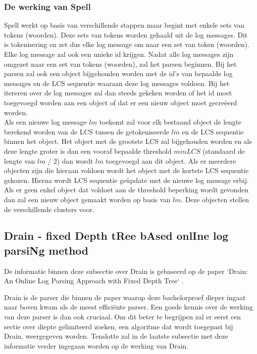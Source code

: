 \subsubsection{De werking van Spell}
Spell werkt op basis van verschillende stappen maar begint met enkele sets van tokens (woorden). Deze sets van tokens worden gehaald uit de log messages. Dit is tokenisering en zet dus elke log message om naar een set van token (woorden). Elke log message zal ook een unieke id krijgen. Nadat alle log messages zijn omgezet naar een set van tokens (woorden), zal het parsen beginnen. Bij het parsen zal ook een object bijgehouden worden met de id's van bepaalde log messages en de LCS sequentie waaraan deze log messages voldoen. Bij het itereren over de log messages zal dan steeds gekeken worden of het id moet toegevoegd worden aan een object of dat er een nieuw object moet gecreëerd worden.\\

Als een nieuwe log message $lm$ toekomt zal voor elk bestaand object de lengte berekend worden van de LCS tussen de getokeniseerde $lm$ en de LCS sequentie binnen het object. Het object met de grootste LCS zal bijgehouden worden en als deze lengte groter is dan een vooraf bepaalde threshold $minLCS$ (standaard de lengte van $lm$ / 2) dan wordt $lm$ toegevoegd aan dit object. Als er meerdere objecten zijn die hieraan voldoen wordt het object met de kortste LCS sequentie gekozen. Hierna wordt LCS sequentie geüpdate met de nieuwe log message erbij. Als er geen enkel object dat voldoet aan de threshold beperking wordt gevonden dan zal een nieuw object gemaakt worden op basis van $lm$. Deze objecten stellen de verschillende clusters voor.

\subsection{Drain - fixed Depth tRee bAsed onlIne log parsiNg method}
De informatie binnen deze subsectie over Drain is gebaseerd op de paper `Drain: An Online Log Parsing Approach with Fixed Depth Tree` \autocite{he2017drain}.

Drain is de parser die binnen de paper waarop deze bachelorproef dieper ingaat \autocite{TBA2019} naar boven kwam als de meest efficiënte parser. Een goede kennis over de werking van deze parser is dan ook cruciaal. Om dit beter te begrijpen zal er eerst een sectie over diepte gelimiteerd zoeken, een algoritme dat wordt toegepast bij Drain, weergegeven worden. Tenslotte zal in de laatste subsectie met deze informatie verder ingegaan worden op de werking van Drain.

